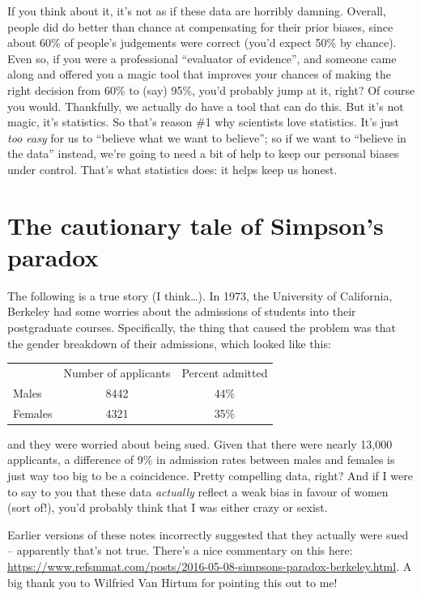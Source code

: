 \documentclass[
]{book}
\begin{document}
If you think about it, it's not as if these data are horribly damning. Overall, people did do better than chance at compensating for their prior biases, since about 60\% of people's judgements were correct (you'd expect 50\% by chance). Even so, if you were a professional ``evaluator of evidence'', and someone came along and offered you a magic tool that improves your chances of making the right decision from 60\% to (say) 95\%, you'd probably jump at it, right? Of course you would. Thankfully, we actually do have a tool that can do this. But it's not magic, it's statistics. So that's reason \#1 why scientists love statistics. It's just \emph{too easy} for us to ``believe what we want to believe''; so if we want to ``believe in the data'' instead, we're going to need a bit of help to keep our personal biases under control. That's what statistics does: it helps keep us honest.

\hypertarget{the-cautionary-tale-of-simpsons-paradox}{%
\section{The cautionary tale of Simpson's paradox}\label{the-cautionary-tale-of-simpsons-paradox}}

The following is a true story (I think\ldots). In 1973, the University of California, Berkeley had some worries about the admissions of students into their postgraduate courses. Specifically, the thing that caused the problem was that the gender breakdown of their admissions, which looked like this:

\begin{longtable}[]{@{}lcc@{}}
\toprule
\endhead
& Number of applicants & Percent admitted\tabularnewline
Males & 8442 & 44\%\tabularnewline
Females & 4321 & 35\%\tabularnewline
\bottomrule
\end{longtable}

and they were worried about being sued. Given that there were nearly 13,000 applicants, a difference of 9\% in admission rates between males and females is just way too big to be a coincidence. Pretty compelling data, right? And if I were to say to you that these data \emph{actually} reflect a weak bias in favour of women (sort of!), you'd probably think that I was either crazy or sexist.

\begin{marginnote}

Earlier versions of these notes incorrectly suggested that they actually were sued -- apparently that's not true. There's a nice commentary on this here: \url{https://www.refsmmat.com/posts/2016-05-08-simpsons-paradox-berkeley.html}. A big thank you to Wilfried Van Hirtum for pointing this out to me!

\end{marginnote}
\end{document}

